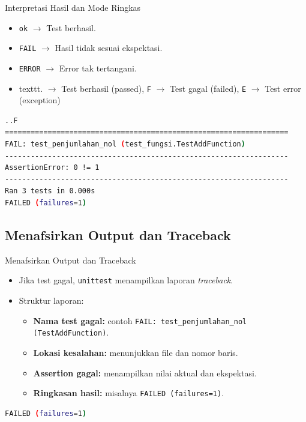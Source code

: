 \documentclass[aspectratio=169, table]{beamer}
\begin{document}
\begin{frame}[fragile]{Interpretasi Hasil dan Mode Ringkas}
\vspace*{20pt}
\begin{itemize}
  \item \texttt{ok} $\rightarrow$ Test berhasil.
  \item \texttt{FAIL} $\rightarrow$ Hasil tidak sesuai ekspektasi.
  \item \texttt{ERROR} $\rightarrow$ Error tak tertangani.
  \item texttt{.} $\rightarrow$ Test berhasil (passed), \texttt{F} $\rightarrow$ Test gagal (failed), \texttt{E} $\rightarrow$ Test error (exception) \\
\end{itemize}

\begin{lstlisting}[language=bash]
..F
==================================================================
FAIL: test_penjumlahan_nol (test_fungsi.TestAddFunction)
------------------------------------------------------------------
AssertionError: 0 != 1
------------------------------------------------------------------
Ran 3 tests in 0.000s
FAILED (failures=1)
\end{lstlisting}
\end{frame}

\subsection{Menafsirkan Output dan Traceback}

\begin{frame}[fragile]{Menafsirkan Output dan Traceback}
\vspace*{20pt}
\begin{itemize}
  \item Jika test gagal, \texttt{unittest} menampilkan laporan \textit{traceback}.
  \item Struktur laporan:
  \begin{itemize}
    \item \textbf{Nama test gagal:} contoh  
      \texttt{FAIL: test\_penjumlahan\_nol (TestAddFunction)}.
    \item \textbf{Lokasi kesalahan:} menunjukkan file dan nomor baris.
    \item \textbf{Assertion gagal:} menampilkan nilai aktual dan ekspektasi.
    \item \textbf{Ringkasan hasil:} misalnya  
      \texttt{FAILED (failures=1)}.
  \end{itemize}
\end{itemize}

\begin{lstlisting}[language=bash]
FAILED (failures=1)
\end{lstlisting}
\end{frame}
\end{document}
